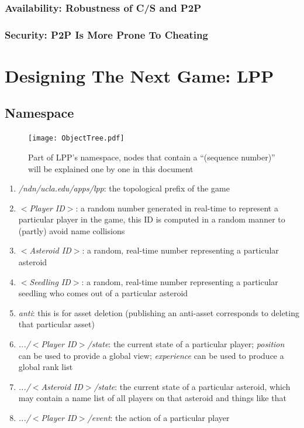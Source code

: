 \documentclass{article}
\begin{document}
\subsubsection{Availability: Robustness of C/S and P2P}

\subsubsection{Security: P2P Is More Prone To Cheating}


\section{Designing The Next Game: LPP}
\label{dslpp}

\subsection{Namespace}

\begin{figure}[htbp]
\begin{center}
\texttt{[image: ObjectTree.pdf]}
\caption{Part of LPP's namespace, nodes that contain a ``(sequence number)'' will be explained one by one in this document}
\label{ns}
\end{center}
\end{figure}

\begin{enumerate}
\item \emph{/ndn/ucla.edu/apps/lpp}: the topological prefix of the game
\item \emph{$<$Player ID$>$}: a random number generated in real-time to represent a particular player in the game, this ID is computed in a random manner to (partly) avoid name collisions
\item \emph{$<$Asteroid ID$>$}: a random, real-time number representing a particular asteroid
\item \emph{$<$Seedling ID$>$}: a random, real-time number representing a particular seedling who comes out of a particular asteroid
\item \emph{anti}: this is for asset deletion (publishing an anti-asset corresponds to deleting that particular asset)
\item \emph{.../$<$Player ID$>$/state}: the current state of a particular player; \emph{position} can be used to provide a global view; \emph{experience} can be used to produce a global rank list
\item \emph{.../$<$Asteroid ID$>$/state}: the current state of a particular asteroid, which may contain a name list of all players on that asteroid and things like that
\item \emph{.../$<$Player ID$>$/event}: the action of a particular player
\end{enumerate}
\end{document}
